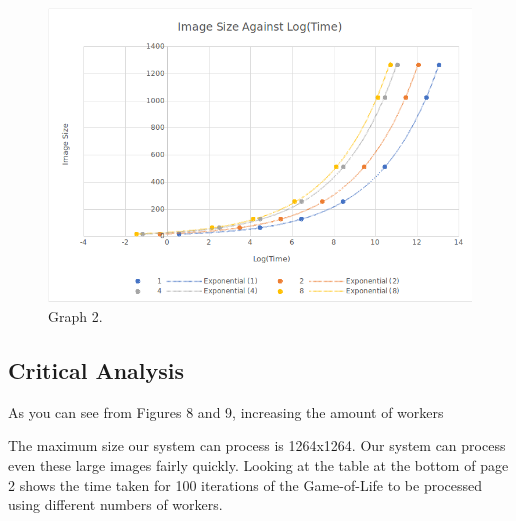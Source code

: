 \documentclass{article}
\begin{document}
\begin{figure}[H]
\centering
\includegraphics[width=15cm]{ImvsLog(Time)(BeforePow).png}
\caption{Graph 2.}
\end{figure}

\newpage


\begin{multicols}{2}

\section{Critical Analysis}
As you can see from Figures 8 and 9, increasing the amount of workers

The maximum size our system can process is 1264x1264. Our system can process even these large
images fairly quickly. Looking at the table at the bottom of page 2 shows the time taken for
100 iterations of the Game-of-Life to be processed using different numbers of workers.

\end{multicols}

\end{document}
